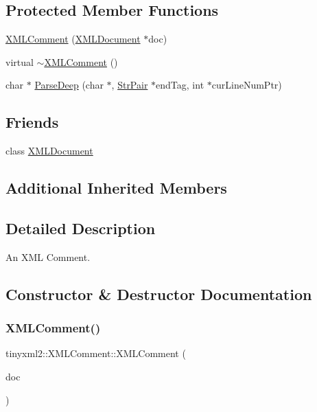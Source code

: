 \subsection*{Protected Member Functions}
\begin{DoxyCompactItemize}
\item 
\hyperlink{classtinyxml2_1_1_x_m_l_comment_ae6463adc3edd93a8e5a9b2b7e99cdf91}{X\+M\+L\+Comment} (\hyperlink{classtinyxml2_1_1_x_m_l_document}{X\+M\+L\+Document} $\ast$doc)
\item 
virtual \hyperlink{classtinyxml2_1_1_x_m_l_comment_ab592f69b47852455c1b32c5e31e453d0}{$\sim$\+X\+M\+L\+Comment} ()
\item 
char $\ast$ \hyperlink{classtinyxml2_1_1_x_m_l_comment_ae61ea28c1ba2e092ba4c63c088ce6474}{Parse\+Deep} (char $\ast$, \hyperlink{classtinyxml2_1_1_str_pair}{Str\+Pair} $\ast$end\+Tag, int $\ast$cur\+Line\+Num\+Ptr)
\end{DoxyCompactItemize}
\subsection*{Friends}
\begin{DoxyCompactItemize}
\item 
class \hyperlink{classtinyxml2_1_1_x_m_l_comment_a4eee3bda60c60a30e4e8cd4ea91c4c6e}{X\+M\+L\+Document}
\end{DoxyCompactItemize}
\subsection*{Additional Inherited Members}


\subsection{Detailed Description}
An X\+ML Comment. 

\subsection{Constructor \& Destructor Documentation}
\mbox{\label{classtinyxml2_1_1_x_m_l_comment_ae6463adc3edd93a8e5a9b2b7e99cdf91}} 
\subsubsection{\texorpdfstring{X\+M\+L\+Comment()}{XMLComment()}}
{\footnotesize\ttfamily tinyxml2\+::\+X\+M\+L\+Comment\+::\+X\+M\+L\+Comment (\begin{DoxyParamCaption}\item[{\hyperlink{classtinyxml2_1_1_x_m_l_document}{X\+M\+L\+Document} $\ast$}]{doc }\end{DoxyParamCaption})\hspace{0.3cm}{\ttfamily [protected]}}

